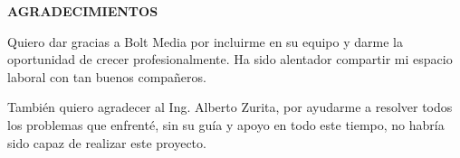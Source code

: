 \begin{center}
  {\Large  \bf{AGRADECIMIENTOS}}
\end{center}
\begin{center}
  Quiero dar gracias a Bolt Media por incluirme en su equipo y darme la oportunidad de crecer profesionalmente. Ha sido alentador compartir mi espacio laboral con tan buenos compañeros.
\end{center}

\begin{center}
  También quiero agradecer al Ing. Alberto Zurita, por ayudarme a resolver todos los problemas que enfrenté, sin su guía y apoyo en todo este tiempo, no habría sido capaz de realizar este proyecto.
\end{center}
